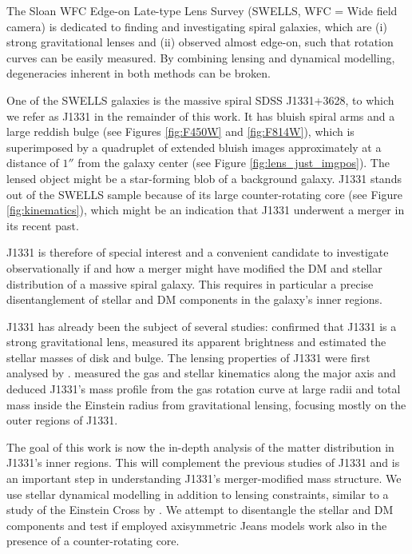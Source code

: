 \documentclass[useAMS,usenatbib]{mnras}
\begin{document}
The Sloan WFC Edge-on Late-type Lens Survey (SWELLS, WFC = Wide field camera) \citep{SWELLSI,SWELLSII,SWELLSIII,SWELLSIV,SWELLSV,SWELLSVI} is dedicated to finding and investigating spiral galaxies, which are (i) strong gravitational lenses and (ii) observed almost edge-on, such that rotation curves can be easily measured. By combining lensing and dynamical modelling, degeneracies inherent in both methods can be broken.

One of the SWELLS galaxies is the massive spiral SDSS J1331+3628, to which we refer as J1331 in the remainder of this work. It has bluish spiral arms and a large reddish bulge (see Figures \ref{fig:F450W} and \ref{fig:F814W}), which is superimposed by a quadruplet of extended bluish images approximately at a distance of $1''$ from the galaxy center (see Figure \ref{fig:lens_just_imgpos}). The lensed object might be a star-forming blob of a background galaxy. J1331 stands out of the SWELLS sample because of its large counter-rotating core (see Figure \ref{fig:kinematics}), which might be an indication that J1331 underwent a merger in its recent past.

J1331 is therefore of special interest and a convenient candidate to investigate observationally if and how a merger might have modified the DM and stellar distribution of a massive spiral galaxy. This requires in particular a precise disentanglement of stellar and DM components in the galaxy's inner regions.

J1331 has already been the subject of several studies: \citet{SWELLSI} confirmed that J1331 is a strong gravitational lens, measured its apparent brightness and estimated the stellar masses of disk and bulge. The lensing properties of J1331 were first analysed by \citet{SWELLSIII}. \citet{SWELLSV} measured the gas and stellar kinematics along the major axis and deduced J1331's mass profile from the gas rotation curve at large radii and total mass inside the Einstein radius from gravitational lensing, focusing mostly on the outer regions of J1331.

The goal of this work is now the in-depth analysis of the matter distribution in J1331's inner regions. This will complement the previous studies of J1331 and is an important step in understanding J1331's merger-modified mass structure. We use stellar dynamical modelling in addition to lensing constraints, similar to a study of the Einstein Cross by \citet{GlennEC}. We attempt to disentangle the stellar and DM components and test if employed axisymmetric Jeans models work also in the presence of a counter-rotating core.
\end{document}
